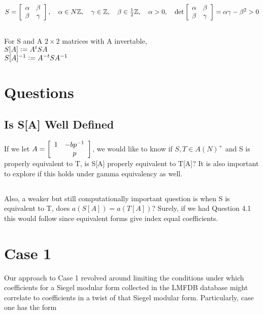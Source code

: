 \documentclass[11pt, oneside]{amsart}
\begin{document}
$S = \left[ \begin{array} { c c } { \alpha } & { \beta } \\ { \beta } & { \gamma } \end{array} \right] , \quad \alpha \in N \mathbb { Z } , \quad \gamma \in \mathbb { Z } , \quad \beta \in \frac { 1 } { 2 } \mathbb { Z } , \quad \alpha > 0 , \quad \operatorname { det } \left[ \begin{array} { c c } { \alpha } & { \beta } \\ { \beta } & { \gamma } \end{array} \right] = \alpha \gamma - \beta ^ { 2 } > 0$
\subsection{}
For S and A $2\times2$ matrices with A invertable,\\
$S[A] \vcentcolon = A^{t}SA$  \\
$S[A]^{-1} \vcentcolon = A^{-t}SA^{-1}  $

\section{Questions}
\subsection{Is S[A] Well Defined}
If we  let $A=\left[\begin{array} { c c } { 1 } & { -bp^{-1} } \\ {  } & { p } \end{array}\right]$, we would like to know if $S,T\in A(N)^{+}$ and S is properly equivalent to T, is S[A] properly equivalent to T[A]?  It is also important to explore if this holds under gamma equivalency as well.
\subsection{}
Also, a weaker but still computationally important question is when S is equivalent to T, does $a(S[A]) = a(T[A])$?  Surely, if we had Question 4.1 this would follow since equivalent forms give index equal coefficients.

\section{Case 1}

Our approach to Case 1 revolved around limiting the conditions under which coefficients for a Siegel modular form collected in the LMFDB database might correlate to coefficients in a twist of that Siegel modular form. Particularly, case one has the form 
\end{document}
